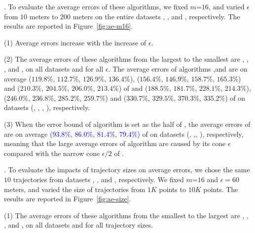 .
To evaluate the average errors of these algorithms, we fixed {$m$=$16$}, and
varied $\epsilon$ from $10$ meters to $200$ meters on the entire
{datasets} \sercar, \geolife, \mopsi and \pricar, respectively.
The results are reported in Figure~\ref{fig:ae-m16}.

\ni(1) Average errors increase with the increase of $\epsilon$.

\ni(2) The average errors of these algorithms from the largest to the smallest are \cista, \cisto, \cist, \dps and \squishe, on all datasets and for all $\epsilon$.
The average errors of algorithms \cist,\cisto and \cista are on average
($119.8\%$, $112.7\%$, $126.9\%$, $136.4\%$), 
($156.4\%$, $146.9\%$, $158.7\%$, $165.3\%$)
and ($210.3\%$, $204.5\%$, $206.0\%$, $213.4\%$)
of \dps and ($188.5\%$, $181.7\%$, $228.1\%$, $214.3\%$),
($246.0\%$, $236.8\%$, $285.2\%$, $259.7\%$) and 
($330.7\%$, $329.5\%$, $370.3\%$, $335.2\%$)
 of \squishe on {datasets} (\sercar, \geolife, \mopsi, \pricar), respectively.

\ni(3) When the error bound of algorithm \cista is set as the half of \cist, the
average errors of \cista are on average \textcolor{blue}{($93.8\%$, $86.0\%$, $81.4\%$, {$79.4\%$})} of \cist on {datasets} (\sercar, \geolife,\mopsi, \pricar), respectively, meaning that the large average errors of algorithm \cista are caused by its cone \wrt $\epsilon$ compared with the narrow cone \wrt $\epsilon/2$ of \cist.


.
To evaluate the impacts of trajectory sizes on average errors, we chose the same
{$10$} trajectories from  {datasets}  \sercar, \geolife, \mopsi and \pricar, respectively.
We fixed {$m$=$16$} and $\epsilon = 60$ meters, and varied the size  of trajectories from $1K$ points to $10K$ points.
%
The results are reported in Figure~\ref{fig:ae-size}.

\ni(1) The average errors of these algorithms from the smallest to the largest are \squishe, \dps, \cist, \cisto and \cista, on all datasets and for all trajectory sizes. %

